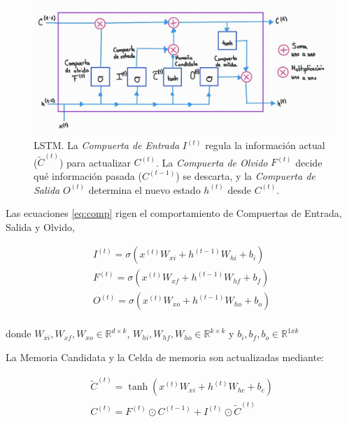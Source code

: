 \begin{figure}[ht!]
\centering
\includegraphics[width=1.0 \textwidth]{Chapters/2. Transformer/Figures/rnn/lstm.jpg}
\caption{LSTM. La \textit{Compuerta de Entrada} $I^{(t)}$ regula la información actual ($\tilde{C}^{(t)}$)
         para actualizar $C^{(t)}$. La \textit{Compuerta de Olvido} $F^{(t)}$ decide qué información
         pasada ($C^{(t-1)}$) se descarta, y la \textit{Compuerta de Salida} $O^{(t)}$ determina el
         nuevo estado $h^{(t)}$ desde $C^{(t)}$.}
\label{fig:rnn_lstm}
\end{figure}

Las ecuaciones \ref{eq:comp} rigen el comportamiento de Compuertas de Entrada, Salida y Olvido,

\begin{equation}
    \begin{split}
        I^{(t)} =  \sigma(x^{(t)} W_{xi} + h^{(t-1)} W_{hi} + b_i)\\
        F^{(t)} =  \sigma(x^{(t)} W_{xf} + h^{(t-1)} W_{hf} + b_f)\\
        O^{(t)} =  \sigma(x^{(t)} W_{xo} + h^{(t-1)} W_{ho} + b_o)\\
    \end{split}
    \label{eq:comp}
\end{equation}

\noindent donde $W_{xi}, W_{xf}, W_{xo} \in \mathbb{R}^{d \times k}$,
$W_{hi}, W_{hf}, W_{ho} \in \mathbb{R}^{k \times k}$ y $b_i, b_f, b_o \in \mathbb{R}^{1xk}$

La Memoria Candidata y la Celda de memoria son actualizadas mediante:

\begin{equation}
    \begin{split}
        \tilde C^{(t)} =  \tanh(x^{(t)} W_{xi} + h^{(t)} W_{hc} + b_c)\\
        C^{(t)} =  F^{(t)} \odot C^{(t-1)} + I^{(t)} \odot \tilde C^{(t)} \\
    \end{split}
\end{equation}

